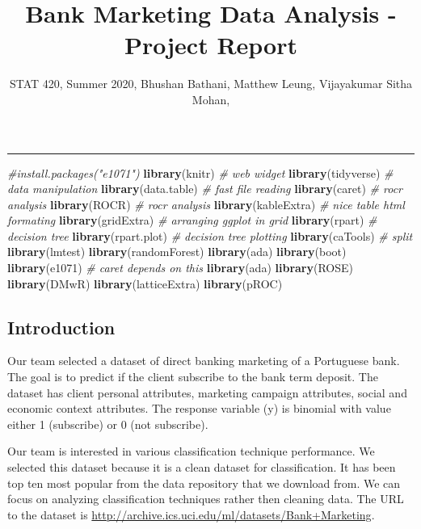 \documentclass[
]{article}
\title{Bank Marketing Data Analysis - Project Report}
\author{STAT 420, Summer 2020, Bhushan Bathani, Matthew Leung, Vijayakumar Sitha
Mohan,}
\date{}
\newenvironment{Shaded}{\begin{snugshade}}{\end{snugshade}}
\newcommand{\CommentTok}[1]{\textcolor[rgb]{0.56,0.35,0.01}{\textit{#1}}}
\newcommand{\KeywordTok}[1]{\textcolor[rgb]{0.13,0.29,0.53}{\textbf{#1}}}
\newcommand{\NormalTok}[1]{#1}
\begin{document}
\maketitle

\begin{center}\rule{0.5\linewidth}{0.5pt}\end{center}

\begin{Shaded}
\begin{Highlighting}[]
\CommentTok{#install.packages("e1071")}
\KeywordTok{library}\NormalTok{(knitr)      }\CommentTok{# web widget}
\KeywordTok{library}\NormalTok{(tidyverse)  }\CommentTok{# data manipulation}
\KeywordTok{library}\NormalTok{(data.table) }\CommentTok{# fast file reading}
\KeywordTok{library}\NormalTok{(caret)      }\CommentTok{# rocr analysis}
\KeywordTok{library}\NormalTok{(ROCR)       }\CommentTok{# rocr analysis}
\KeywordTok{library}\NormalTok{(kableExtra) }\CommentTok{# nice table html formating }
\KeywordTok{library}\NormalTok{(gridExtra)  }\CommentTok{# arranging ggplot in grid}
\KeywordTok{library}\NormalTok{(rpart)      }\CommentTok{# decision tree}
\KeywordTok{library}\NormalTok{(rpart.plot) }\CommentTok{# decision tree plotting}
\KeywordTok{library}\NormalTok{(caTools)    }\CommentTok{# split}
\KeywordTok{library}\NormalTok{(lmtest)}
\KeywordTok{library}\NormalTok{(randomForest)}
\KeywordTok{library}\NormalTok{(ada)}
\KeywordTok{library}\NormalTok{(boot)}
\KeywordTok{library}\NormalTok{(e1071)      }\CommentTok{# caret depends on this}
\KeywordTok{library}\NormalTok{(ada)}
\KeywordTok{library}\NormalTok{(ROSE)}
\KeywordTok{library}\NormalTok{(DMwR)}
\KeywordTok{library}\NormalTok{(latticeExtra)}
\KeywordTok{library}\NormalTok{(pROC)}
\end{Highlighting}
\end{Shaded}

\hypertarget{introduction}{%
\subsection{Introduction}\label{introduction}}

Our team selected a dataset of direct banking marketing of a Portuguese
bank. The goal is to predict if the client subscribe to the bank term
deposit. The dataset has client personal attributes, marketing campaign
attributes, social and economic context attributes. The response
variable (y) is binomial with value either 1 (subscribe) or 0 (not
subscribe).

Our team is interested in various classification technique performance.
We selected this dataset because it is a clean dataset for
classification. It has been top ten most popular from the data
repository that we download from. We can focus on analyzing
classification techniques rather then cleaning data. The URL to the
dataset is \url{http://archive.ics.uci.edu/ml/datasets/Bank+Marketing}.
\end{document}
